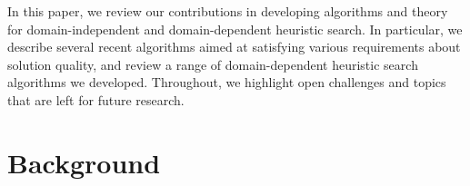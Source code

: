 \documentclass{article}
\begin{document}
 In this paper, we review our contributions in developing algorithms and theory for domain-independent and domain-dependent heuristic search. In particular, we describe several recent algorithms aimed at satisfying various requirements about solution quality, and review a range of domain-dependent heuristic search algorithms we developed. Throughout, we highlight open challenges and topics that are left for future research. 
%

\section{Background}




\end{document}
